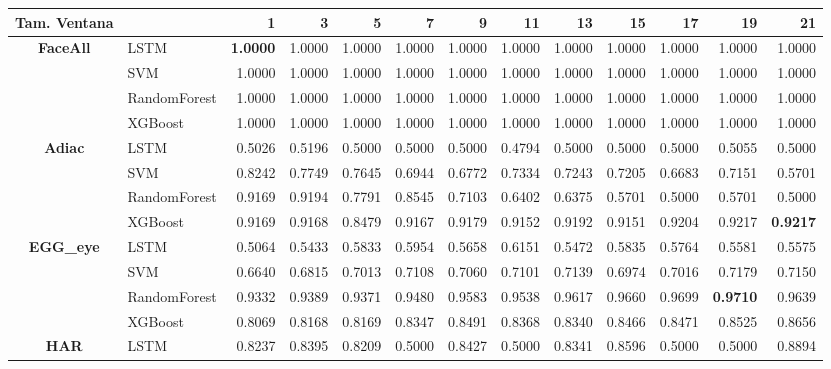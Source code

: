\newpage
\begin{table}[h]
\centering
\begin{adjustbox}{max width=15cm}
\begin{tabular}{|c|l|r|r|r|r|r|r|r|r|r|r|r|}
	\hline
	\textbf{Tam. Ventana}&         &      1  &      3  &      5  &      7  &      9  &      11 &      13 &      15 &      17 &      19 &      21 \\
	\hline
	\textbf{FaceAll} & LSTM &  \textbf{1.0000} &  1.0000 &  1.0000 &  1.0000 &  1.0000 &  1.0000 &  1.0000 &  1.0000 &  1.0000 &  1.0000 &  1.0000 \\
	& SVM &  1.0000 &  1.0000 &  1.0000 &  1.0000 &  1.0000 &  1.0000 &  1.0000 &  1.0000 &  1.0000 &  1.0000 &  1.0000 \\
	& RandomForest &  1.0000 &  1.0000 &  1.0000 &  1.0000 &  1.0000 &  1.0000 &  1.0000 &  1.0000 &  1.0000 &  1.0000 &  1.0000 \\
	& XGBoost &  1.0000 &  1.0000 &  1.0000 &  1.0000 &  1.0000 &  1.0000 &  1.0000 &  1.0000 &  1.0000 &  1.0000 &  1.0000 \\
	\hline
	\textbf{Adiac} & LSTM &  0.5026 &  0.5196 &  0.5000 &  0.5000 &  0.5000 &  0.4794 &  0.5000 &  0.5000 &  0.5000 &  0.5055 &  0.5000 \\
	& SVM &  0.8242 &  0.7749 &  0.7645 &  0.6944 &  0.6772 &  0.7334 &  0.7243 &  0.7205 &  0.6683 &  0.7151 &  0.5701 \\
	& RandomForest &  0.9169 &  0.9194 &  0.7791 &  0.8545 &  0.7103 &  0.6402 &  0.6375 &  0.5701 &  0.5000 &  0.5701 &  0.5000 \\
	& XGBoost &  0.9169 &  0.9168 &  0.8479 &  0.9167 &  0.9179 &  0.9152 &  0.9192 &  0.9151 &  0.9204 &  0.9217 &  \textbf{0.9217} \\
	\hline
	\textbf{EGG\_eye} & LSTM &  0.5064 &  0.5433 &  0.5833 &  0.5954 &  0.5658 &  0.6151 &  0.5472 &  0.5835 &  0.5764 &  0.5581 &  0.5575 \\
	& SVM &  0.6640 &  0.6815 &  0.7013 &  0.7108 &  0.7060 &  0.7101 &  0.7139 &  0.6974 &  0.7016 &  0.7179 &  0.7150 \\
	& RandomForest &  0.9332 &  0.9389 &  0.9371 &  0.9480 &  0.9583 &  0.9538 &  0.9617 &  0.9660 &  0.9699 &  \textbf{0.9710} &  0.9639 \\
	& XGBoost &  0.8069 &  0.8168 &  0.8169 &  0.8347 &  0.8491 &  0.8368 &  0.8340 &  0.8466 &  0.8471 &  0.8525 &  0.8656 \\
	\hline
	\textbf{HAR} & LSTM &  0.8237 &  0.8395 &  0.8209 &  0.5000 &  0.8427 &  0.5000 &  0.8341 &  0.8596 &  0.5000 &  0.5000 &  0.8894 \\

\end{tabular}
\end{adjustbox}
\end{table}
